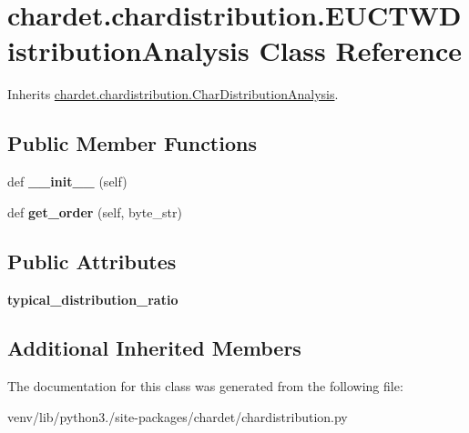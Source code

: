 \hypertarget{classchardet_1_1chardistribution_1_1_e_u_c_t_w_distribution_analysis}{}\section{chardet.\+chardistribution.\+E\+U\+C\+T\+W\+Distribution\+Analysis Class Reference}
\label{classchardet_1_1chardistribution_1_1_e_u_c_t_w_distribution_analysis}


Inherits \hyperlink{classchardet_1_1chardistribution_1_1_char_distribution_analysis}{chardet.\+chardistribution.\+Char\+Distribution\+Analysis}.

\subsection*{Public Member Functions}
\begin{DoxyCompactItemize}
\item 
\mbox{\label{classchardet_1_1chardistribution_1_1_e_u_c_t_w_distribution_analysis_ab3ba8297cf3eedfd845d5ca7286f82cd}} 
def {\bfseries \+\_\+\+\_\+init\+\_\+\+\_\+} (self)
\item 
\mbox{\label{classchardet_1_1chardistribution_1_1_e_u_c_t_w_distribution_analysis_a176e720377332a7612b6e3a5cb0b1a5a}} 
def {\bfseries get\+\_\+order} (self, byte\+\_\+str)
\end{DoxyCompactItemize}
\subsection*{Public Attributes}
\begin{DoxyCompactItemize}
\item 
\mbox{\label{classchardet_1_1chardistribution_1_1_e_u_c_t_w_distribution_analysis_a5c580340e297c8dfc3eda3902d07867f}} 
{\bfseries typical\+\_\+distribution\+\_\+ratio}
\end{DoxyCompactItemize}
\subsection*{Additional Inherited Members}


The documentation for this class was generated from the following file\+:\begin{DoxyCompactItemize}
\item 
venv/lib/python3./site-\/packages/chardet/chardistribution.\+py\end{DoxyCompactItemize}
